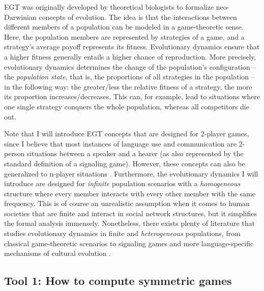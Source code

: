 \documentclass[output=paper,hidelinks]{langscibook}
\begin{document}
 
EGT was originally developed by theoretical biologists \citep{Maynard73,Maynard82} to formalize neo-Darwinian concepts of evolution. The idea is that the interactions between different members of a population can be modeled in a game-theoretic sense. Here, the population members are represented by strategies of a game, and a strategy's average payoff represents its fitness. Evolutionary dynamics ensure that a higher fitness generally entails a higher chance of reproduction. 
More precisely, evolutionary dynamics determines the change of the population's configuration -- the \emph{population state}, that is, the proportions of all strategies in the population -- in the following way: the greater/less the relative fitness of a strategy, the more its proportion increases/decreases. This can, for example, lead to situations where one single strategy conquers the whole population, whereas all competitors die out. 

Note that I will introduce EGT concepts that are designed for 2-player games, since I believe that most instances of language use and communication are 2-person situations between a speaker and a hearer (as also represented by the standard definition of a signaling game). However, these concepts can also be generalized to n-player situations \citep[cf.][]{Hofbauer_2003,Veelen_2011}. Furthermore, the evolutionary dynamics I will introduce are designed for \emph{infinite} population scenarios with a \emph{homogeneous} structure where every member interacts with every other member with the same frequency. This is of course an unrealistic assumption when it comes to human societies that are finite and interact in social network structures, but it simplifies the formal analysis immensely. Nonetheless, there exists plenty of literature that studies  evolutionary dynamics in finite and \emph{heterogeneous} populations, from classical game-theoretic scenarios \citep[cf.][]{Nowak_1992,Taylor_2004,Lieberman_2005} to signaling games \citep[cf.][]{Skyrms10,Huttegger11,Muehlenbernd_14,Muehlenbernd2021,Muehlenbernd2022} and more language-specific mechanisms of cultural evolution \citep[cf.][]{Baxter_2006,Fagyal10,Blythe_2012}.


\subsection{Tool 1: How to compute symmetric games}
\end{document}
